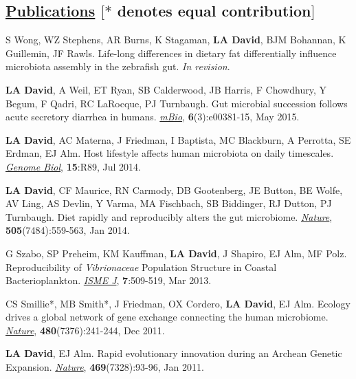 \documentclass[overlapped,line,11pt]{res}
\begin{document}
\begin{resume}
\section{\underline{\sc Publications} \hspace{2.95in} \sc $[\ast$ denotes equal
      contribution$]$}

\vspace{.25in}

\begin{revnumerate}[13]

\item {S Wong, WZ Stephens, AR Burns, K Stagaman, \textbf{LA David}, BJM
  Bohannan, K Guillemin, JF Rawls.  Life-long differences in dietary
  fat differentially influence microbiota assembly in the zebrafish
  gut. \emph{In revision}.}

\item {\textbf{LA David}, A Weil, ET Ryan, SB Calderwood, JB Harris, F
  Chowdhury, Y Begum, F Qadri, RC LaRocque, PJ Turnbaugh.  Gut
  microbial succession follows acute secretory diarrhea in humans.
 \emph{\underline{mBio}}, \textbf{6}(3):e00381-15, May 2015.}

\item {\textbf{LA David}, AC Materna, J Friedman, I Baptista, MC
  Blackburn, A Perrotta, SE Erdman, EJ Alm.  Host lifestyle affects
  human microbiota on daily timescales.
  \emph{\underline{Genome Biol}}, \textbf{15}:R89, Jul 2014.}

\item {\textbf{LA David}, CF Maurice, RN Carmody, DB Gootenberg, JE
  Button, BE Wolfe, AV Ling, AS Devlin, Y Varma, MA Fischbach, SB
  Biddinger, RJ Dutton, PJ Turnbaugh.  Diet rapidly and reproducibly
  alters the gut microbiome. \emph{\underline{Nature}},
  \textbf{505}(7484):559-563, Jan 2014.}

\item {G Szabo, SP Preheim, KM Kauffman, \textbf{LA David}, J Shapiro,
  EJ Alm, MF Polz.  Reproducibility of \emph{Vibrionaceae} Population
  Structure in Coastal Bacterioplankton. \emph{\underline{ISME J}},
  \textbf{7}:509-519, Mar 2013.}

\item {CS Smillie*, MB Smith*, J Friedman, OX Cordero, \textbf{LA
    David}, EJ Alm.  Ecology drives a global network of gene exchange
  connecting the human microbiome. \emph{\underline{Nature}},
  \textbf{480}(7376):241-244, Dec 2011.}

\item {\textbf{LA David}, EJ Alm.  Rapid evolutionary innovation during
  an Archean Genetic Expansion.  \emph{\underline{Nature}},
  \textbf{469}(7328):93-96, Jan 2011.}


\end{revnumerate}
\end{resume}
\end{document}
